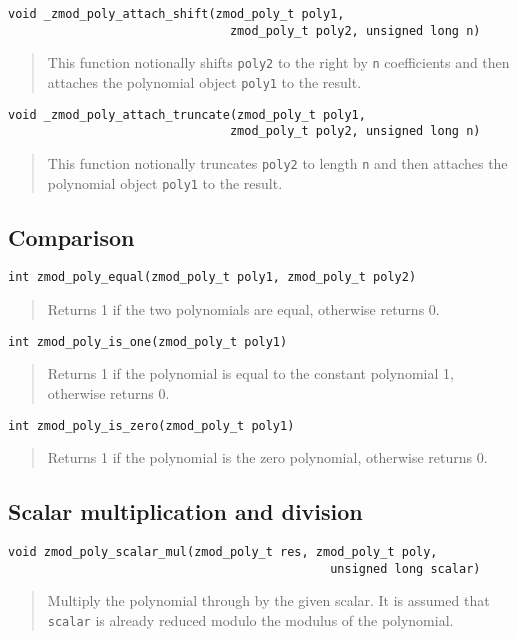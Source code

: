 \documentclass[a4paper,10pt]{article}
\newcommand{\code}{\lstinline}
\begin{document}
\begin{lstlisting}
void _zmod_poly_attach_shift(zmod_poly_t poly1, 
                               zmod_poly_t poly2, unsigned long n)
\end{lstlisting}
\begin{quote}
This function notionally shifts \code{poly2} to the right by \code{n} coefficients and then attaches the polynomial object \code{poly1} to the result.
\end{quote}

\begin{lstlisting}
void _zmod_poly_attach_truncate(zmod_poly_t poly1, 
                               zmod_poly_t poly2, unsigned long n)
\end{lstlisting}
\begin{quote}
This function notionally truncates \code{poly2} to length \code{n} and then attaches the polynomial object \code{poly1} to the result.
\end{quote}

\subsection{Comparison}
\begin{lstlisting}
int zmod_poly_equal(zmod_poly_t poly1, zmod_poly_t poly2)
\end{lstlisting}
\begin{quote}
Returns 1 if the two polynomials are equal, otherwise returns 0.
\end{quote}

\begin{lstlisting}
int zmod_poly_is_one(zmod_poly_t poly1)
\end{lstlisting}
\begin{quote}
Returns 1 if the polynomial is equal to the constant polynomial 1, otherwise returns 0.
\end{quote}

\begin{lstlisting}
int zmod_poly_is_zero(zmod_poly_t poly1)
\end{lstlisting}
\begin{quote}
Returns 1 if the polynomial is the zero polynomial, otherwise returns 0. 
\end{quote}

\subsection{Scalar multiplication and division}
\begin{lstlisting}
void zmod_poly_scalar_mul(zmod_poly_t res, zmod_poly_t poly, 
                                             unsigned long scalar)
\end{lstlisting}
\begin{quote}
Multiply the polynomial through by the given scalar. It is assumed that \code{scalar} is already reduced modulo the modulus of the polynomial.
\end{quote}
\end{document}
